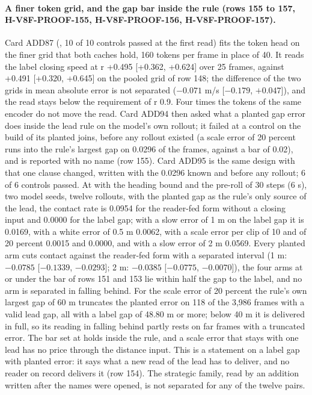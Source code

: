\paragraph{A finer token grid, and the gap bar inside the rule (rows 155 to 157, H-V8F-PROOF-155, H-V8F-PROOF-156, H-V8F-PROOF-157).} Card ADD87 (, 10 of 10 controls passed at the first read) fits the token head on the finer grid that both caches hold, 160 tokens per frame in place of 40. It reads the label closing speed at r +0.495 [+0.362, +0.624] over 25 frames, against +0.491 [+0.320, +0.645] on the pooled grid of row 148; the difference of the two grids in mean absolute error is not separated ($-0.071$ m/s [$-0.179$, $+0.047$]), and the read stays below the requirement of r 0.9. Four times the tokens of the same encoder do not move the read. Card ADD94 then asked what a planted gap error does inside the lead rule on the model's own rollout; it failed at a control on the build of its planted joins, before any rollout existed (a scale error of 20 percent runs into the rule's largest gap on 0.0296 of the frames, against a bar of 0.02), and is reported with no name (row 155). Card ADD95 is the same design with that one clause changed, written with the 0.0296 known and before any rollout; 6 of 6 controls passed. At  with the heading bound and the pre-roll of 30 steps (6 s), two model seeds, twelve rollouts, with the planted gap as the rule's only source of the lead, the contact rate is 0.0954 for the reader-fed form without a closing input and 0.0000 for the label gap; with a slow error of 1 m on the label gap it is 0.0169, with a white error of 0.5 m 0.0062, with a scale error per clip of 10 and of 20 percent 0.0015 and 0.0000, and with a slow error of 2 m 0.0569. Every planted arm cuts contact against the reader-fed form with a separated interval (1 m: $-0.0785$ [$-0.1339$, $-0.0293$]; 2 m: $-0.0385$ [$-0.0775$, $-0.0070$]), the four arms at or under the bar of rows 151 and 153 lie within half the gap to the label, and no arm is separated in falling behind. For the scale error of 20 percent the rule's own largest gap of 60 m truncates the planted error on 118 of the 3,986 frames with a valid lead gap, all with a label gap of 48.80 m or more; below 40 m it is delivered in full, so its reading in falling behind partly rests on far frames with a truncated error. The bar set at  holds inside the rule, and a scale error that stays with one lead has no price through the distance input. This is a statement on a label gap with planted error: it says what a new read of the lead has to deliver, and no reader on record delivers it (row 154). The strategic family, read by an addition written after the names were opened, is not separated for any of the twelve pairs.

